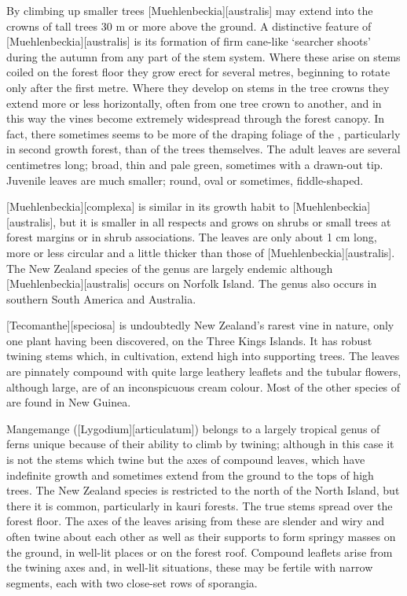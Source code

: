 By climbing up smaller trees [Muehlenbeckia][australis] may extend into the crowns of tall trees 30 m or more above the ground.
A distinctive feature of [Muehlenbeckia][australis] is its formation of firm cane-like `searcher shoots' during the autumn from any part of the stem system.
Where these arise on stems coiled on the forest floor they grow erect for several metres, beginning to rotate only after the first metre.
Where they develop on stems in the tree crowns they extend more or less horizontally, often from one tree crown to another, and in this way the vines become extremely widespread through the forest canopy.
In fact, there sometimes seems to be more of the draping foliage of the , particularly in second growth forest, than of the trees themselves.
The adult leaves are several centimetres long; broad, thin and pale green, sometimes with a drawn-out tip.
Juvenile leaves are much smaller; round, oval or sometimes, fiddle-shaped.

[Muehlenbeckia][complexa] is similar in its growth habit to [Muehlenbeckia][australis], but it is smaller in all respects and grows on shrubs or small trees at forest margins or in shrub associations.
The leaves are only about 1 cm long, more or less circular and a little thicker than those of [Muehlenbeckia][australis].
The New Zealand species of the genus are largely endemic although [Muehlenbeckia][australis] occurs on Norfolk Island.
The genus also occurs in southern South America and Australia.

[Tecomanthe][speciosa] is undoubtedly New Zealand's rarest vine in nature, only one plant having been discovered, on the Three Kings Islands.
It has robust twining stems which, in cultivation, extend high into supporting trees.
The leaves are pinnately compound with quite large leathery leaflets and the tubular flowers, although large, are of an inconspicuous cream colour.
Most of the other species of  are found in New Guinea.

Mangemange ([Lygodium][articulatum]) belongs to a largely tropical genus of ferns unique because of their ability to climb by twining; although in this case it is not the stems which twine but the axes of compound leaves, which have indefinite growth and sometimes extend from the ground to the tops of high trees.
The New Zealand species is restricted to the north of the North Island, but there it is common, particularly in kauri forests.
The true stems spread over the forest floor.
The axes of the leaves arising from these are slender and wiry and often twine about each other as well as their supports to form springy masses on the ground, in well-lit places or on the forest roof.
Compound leaflets arise from the twining axes and, in well-lit situations, these may be fertile with narrow segments, each with two close-set rows of sporangia.


